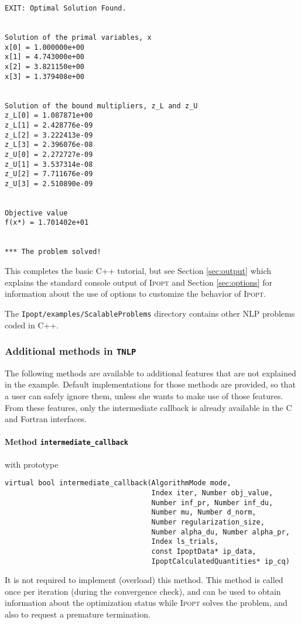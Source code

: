\documentclass[10pt]{article}
\newcommand{\Ipopt}{\textsc{Ipopt}\xspace}
\begin{document}
\begin{footnotesize}
\begin{verbatim}
EXIT: Optimal Solution Found.


Solution of the primal variables, x
x[0] = 1.000000e+00
x[1] = 4.743000e+00
x[2] = 3.821150e+00
x[3] = 1.379408e+00


Solution of the bound multipliers, z_L and z_U
z_L[0] = 1.087871e+00
z_L[1] = 2.428776e-09
z_L[2] = 3.222413e-09
z_L[3] = 2.396076e-08
z_U[0] = 2.272727e-09
z_U[1] = 3.537314e-08
z_U[2] = 7.711676e-09
z_U[3] = 2.510890e-09


Objective value
f(x*) = 1.701402e+01


*** The problem solved!
\end{verbatim}
\end{footnotesize}

This completes the basic C++ tutorial, but see Section
\ref{sec:output} which explains the standard console output of \Ipopt
and Section \ref{sec:options} for information about the use of options
to customize the behavior of \Ipopt.

The {\tt Ipopt/examples/ScalableProblems} directory contains other NLP
problems coded in C++.

\subsubsection{Additional methods in {\tt TNLP}}\label{sec:add_meth}

The following methods are available to additional features that are
not explained in the example.  Default implementations for those
methods are provided, so that a user can safely ignore them, unless
she wants to make use of those features.  From these features, only the 
intermediate callback is already available in the C and Fortran interfaces.

\paragraph{Method \texttt{intermediate\_callback}} with prototype
\begin{verbatim}
virtual bool intermediate_callback(AlgorithmMode mode,
                                   Index iter, Number obj_value,
                                   Number inf_pr, Number inf_du,
                                   Number mu, Number d_norm,
                                   Number regularization_size,
                                   Number alpha_du, Number alpha_pr,
                                   Index ls_trials,
                                   const IpoptData* ip_data,
                                   IpoptCalculatedQuantities* ip_cq)
\end{verbatim}
It is not required to implement (overload) this method.  This method
is called once per iteration (during the convergence check), and can
be used to obtain information about the optimization status while
\Ipopt solves the problem, and also to request a premature
termination.
\end{document}
